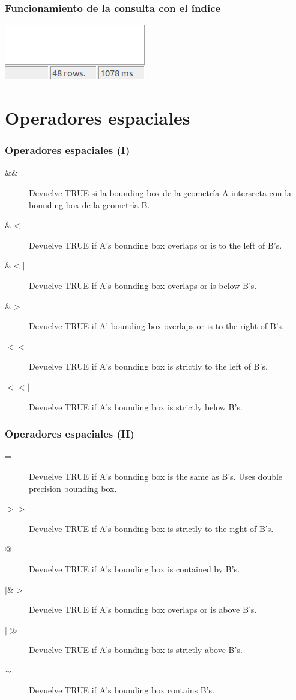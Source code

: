 \documentclass{classes/beamer_GeomaticaUA}
\begin{document}
\begin{frame}[fragile]
\frametitle{Funcionamiento de la consulta con el índice}
\center\includegraphics[scale=0.5]{images/resultWithIndex.png}
\end{frame}
\section[Operadores]{Operadores espaciales}
\begin{frame}[fragile]
\frametitle{Operadores espaciales (I)}
\begin{description}
\item[\&\&]Devuelve TRUE si la bounding box de la geometría A intersecta con la bounding box de la geometría B.
\item[\&$<$]Devuelve TRUE if A's bounding box overlaps or is to the left of B's.
\item[\&$<|$]Devuelve TRUE if A's bounding box overlaps or is below B's.
\item[\&$>$]Devuelve TRUE if A' bounding box overlaps or is to the right of B's.
\item[$<<$]Devuelve TRUE if A's bounding box is strictly to the left of B's.
\item[$<<|$]Devuelve TRUE if A's bounding box is strictly below B's.
\end{description}
\end{frame}
\begin{frame}[fragile]
\frametitle{Operadores espaciales (II)}
\begin{description}
\item[=]Devuelve TRUE if A's bounding box is the same as B's. Uses double precision bounding box.
\item[$>>$]Devuelve TRUE if A's bounding box is strictly to the right of B's.
\item[$@$]Devuelve TRUE if A's bounding box is contained by B's.
\item[$\mid$\&$>$]Devuelve TRUE if A's bounding box overlaps or is above B's.
\item[$\mid\gg$]Devuelve TRUE if A's bounding box is strictly above B's.
\item[$\thicksim$]Devuelve TRUE if A's bounding box contains B's.
\end{description}
\end{frame}
\end{document}
